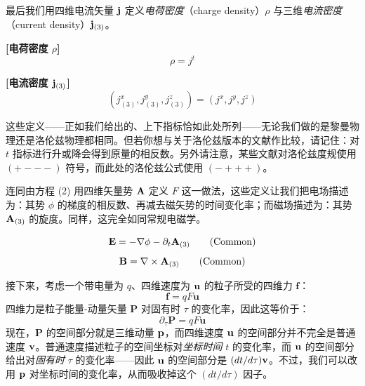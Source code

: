 最后我们用四维电流矢量 $\mathbf{j}$ 定义\emph{电荷密度}（charge density）$\rho$ 与三维\emph{电流密度}（current density）$\mathbf{j}_{(3)}$。

\begin{keybox}[电荷密度与电流密度]
\textbf{[电荷密度 $\rho$]}
\begin{equation}
\rho = j^{t} \tag{Common}
\end{equation}

\textbf{[电流密度 $\mathbf{j}_{(3)}$]}
\begin{equation}
(j_{(3)}^{x}, j_{(3)}^{y}, j_{(3)}^{z}) = (j^{x}, j^{y}, j^{z}) \tag{Common}
\end{equation}
\end{keybox}

这些定义——正如我们给出的、上下指标恰如此处所列——无论我们做的是黎曼物理还是洛伦兹物理都相同。但若你想与关于洛伦兹版本的文献作比较，请记住：对 $t$ 指标进行升或降会得到原量的相反数。另外请注意，某些文献对洛伦兹度规使用 $(+---)$ 符号，而此处的洛伦兹公式使用 $(-+++)$。

连同由方程 (2) 用四维矢量势 $\mathbf{A}$ 定义 $F$ 这一做法，这些定义让我们把电场描述为：其势 $\phi$ 的梯度的相反数、再减去磁矢势的时间变化率；而磁场描述为：其势 $\mathbf{A}_{(3)}$ 的旋度。同样，这完全如同常规电磁学。

\begin{keybox}[由势给出的场]
\begin{equation}
\mathbf{E} = -\nabla\phi - \partial_{t}\mathbf{A}_{(3)} \tag{Common}
\end{equation}
\begin{equation}
\mathbf{B} = \nabla\times\mathbf{A}_{(3)} \tag{Common}
\end{equation}
\end{keybox}

接下来，考虑一个带电量为 $q$、四维速度为 $\mathbf{u}$ 的粒子所受的四维力 $\mathbf{f}$：
\begin{equation}
\mathbf{f} = q F \mathbf{u} \tag{5}
\end{equation}
四维力是粒子能量-动量矢量 $\mathbf{P}$ 对固有时 $\tau$ 的变化率，因此这等价于：
\begin{equation}
\partial_{\tau}\mathbf{P} = q F \mathbf{u} \tag{6}
\end{equation}
现在，$\mathbf{P}$ 的空间部分就是三维动量 $\mathbf{p}$，而四维速度 $\mathbf{u}$ 的空间部分并不完全是普通速度 $\mathbf{v}$。普通速度描述粒子的空间坐标对\emph{坐标时间} $t$ 的变化率，而 $\mathbf{u}$ 的空间部分给出对\emph{固有时} $\tau$ 的变化率——因此 $\mathbf{u}$ 的空间部分是 $(dt/d\tau)\mathbf{v}$。不过，我们可以改用 $\mathbf{p}$ 对坐标时间的变化率，从而吸收掉这个 $(dt/d\tau)$ 因子。

